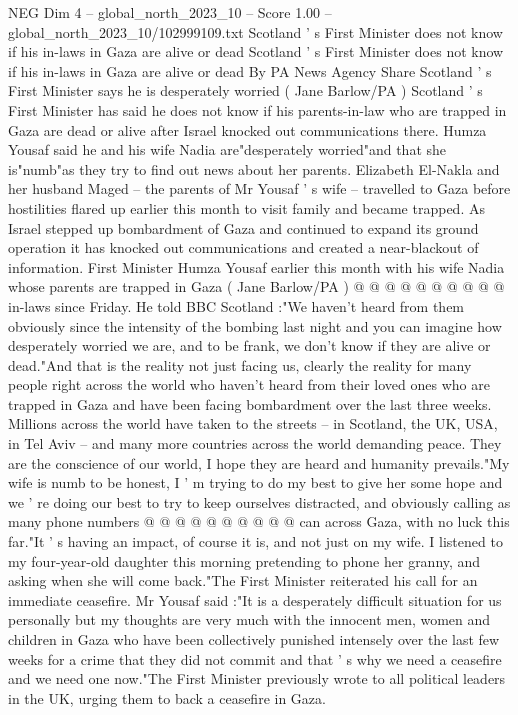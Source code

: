 \begin{textsample}{NEG Dim 4 – global\_north\_2023\_10 – Score 1.00 – global\_north\_2023\_10/102999109.txt}  \label{ex:f4_neg_020}
Scotland ' s First Minister does not know if his in-laws in Gaza are alive or dead Scotland ' s First Minister does not know if his in-laws in Gaza are alive or dead By PA News Agency Share Scotland ' s First Minister says he is desperately worried ( Jane Barlow/PA ) Scotland ' s First Minister has said he does not know if his parents-in-law who are trapped in Gaza are dead or alive after Israel knocked out communications there.
Humza Yousaf said he and his wife Nadia are"desperately worried"and that she is"numb"as they try to find out news about her parents.
Elizabeth El-Nakla and her husband Maged -- the parents of Mr Yousaf ' s wife -- travelled to Gaza before hostilities flared up earlier this month to visit family and became trapped.
As Israel stepped up bombardment of Gaza and continued to expand its ground operation it has knocked out communications and created a near-blackout of information.
First Minister Humza Yousaf earlier this month with his wife Nadia whose parents are trapped in Gaza ( Jane Barlow/PA ) @ @ @ @ @ @ @ @ @ @ in-laws since Friday.
He told BBC Scotland :"We haven't heard from them obviously since the intensity of the bombing last night and you can imagine how desperately worried we are, and to be frank, we don't know if they are alive or dead."And that is the reality not just facing us, clearly the reality for many people right across the world who haven't heard from their loved ones who are trapped in Gaza and have been facing bombardment over the last three weeks.
Millions across the world have taken to the streets -- in Scotland, the UK, USA, in Tel Aviv -- and many more countries across the world demanding peace.
They are the conscience of our world, I hope they are heard and humanity prevails."My wife is numb to be honest, I ' m trying to do my best to give her some hope and we ' re doing our best to try to keep ourselves distracted, and obviously calling as many phone numbers @ @ @ @ @ @ @ @ @ @ can across Gaza, with no luck this far."It ' s having an impact, of course it is, and not just on my wife.
I listened to my four-year-old daughter this morning pretending to phone her granny, and asking when she will come back."The First Minister reiterated his call for an immediate ceasefire.
Mr Yousaf said :"It is a desperately difficult situation for us personally but my thoughts are very much with the innocent men, women and children in Gaza who have been collectively punished intensely over the last few weeks for a crime that they did not commit and that ' s why we need a ceasefire and we need one now."The First Minister previously wrote to all political leaders in the UK, urging them to back a ceasefire in Gaza.

\end{textsample}
